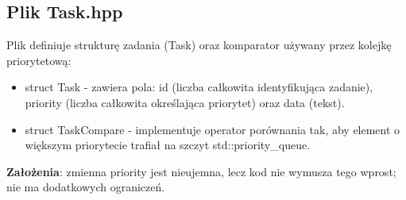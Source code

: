 \documentclass[a4paper,12pt]{article}
\begin{document}
        \subsection{Plik Task.hpp}
            \vspace{-0.2em}
            Plik definiuje strukturę zadania (Task) oraz komparator używany przez kolejkę priorytetową:
            \begin{itemize}
                \item struct Task - zawiera pola: id (liczba całkowita identyfikująca zadanie), priority (liczba całkowita określająca priorytet) oraz data (tekst).
                \item struct TaskCompare - implementuje operator porównania tak, aby element o większym priorytecie trafiał na szczyt std::priority\_queue.
            \end{itemize}
            \textbf{Założenia}: zmienna priority jest nieujemna, lecz kod nie wymusza tego wprost; nie ma dodatkowych ograniczeń.
            \vspace{1em}
\end{document}
